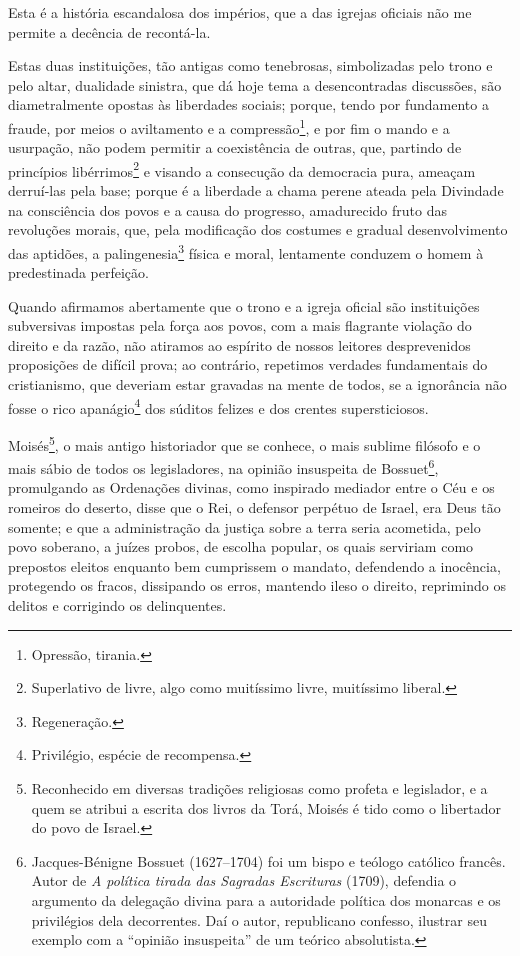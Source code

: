 Esta é a história escandalosa dos impérios, que a das igrejas oficiais
não me permite a decência de recontá-la.

Estas duas instituições, tão antigas como tenebrosas, simbolizadas pelo
trono e pelo altar, dualidade sinistra, que dá hoje tema a
desencontradas discussões, são diametralmente opostas às liberdades
sociais; porque, tendo por fundamento a fraude, por meios o aviltamento
e a compressão\footnote{Opressão, tirania.}, e por fim o mando e a
usurpação, não podem permitir a coexistência de outras, que, partindo de
princípios libérrimos\footnote{Superlativo de livre, algo como
  muitíssimo livre, muitíssimo liberal.} e visando a consecução da
democracia pura, ameaçam derruí-las pela base; porque é a liberdade a
chama perene ateada pela Divindade na consciência dos povos e a causa do
progresso, amadurecido fruto das revoluções morais, que, pela
modificação dos costumes e gradual desenvolvimento das aptidões, a
palingenesia\footnote{Regeneração.} física e moral, lentamente
conduzem o homem à predestinada perfeição.

Quando afirmamos abertamente que o trono e a igreja oficial são
instituições subversivas impostas pela força aos povos, com a mais
flagrante violação do direito e da razão, não atiramos ao espírito de
nossos leitores desprevenidos proposições de difícil prova; ao
contrário, repetimos verdades fundamentais do cristianismo, que deveriam
estar gravadas na mente de todos, se a ignorância não fosse o rico
apanágio\footnote{Privilégio, espécie de recompensa.} dos súditos
felizes e dos crentes supersticiosos.

Moisés\footnote{Reconhecido em diversas tradições religiosas como
  profeta e legislador, e a quem se atribui a escrita dos livros da
  Torá, Moisés é tido como o libertador do povo de Israel.}, o mais
antigo historiador que se conhece, o mais sublime filósofo e o mais
sábio de todos os legisladores, na opinião insuspeita de
Bossuet\footnote{Jacques-Bénigne Bossuet (1627--1704) foi um bispo e
  teólogo católico francês. Autor de \emph{A política tirada das
  Sagradas Escrituras} (1709), defendia o argumento da delegação divina
  para a autoridade política dos monarcas e os privilégios dela
  decorrentes. Daí o autor, republicano confesso, ilustrar seu exemplo
  com a ``opinião insuspeita'' de um teórico absolutista.}, promulgando as
Ordenações divinas, como inspirado mediador entre o Céu e os romeiros do
deserto, disse que o Rei, o defensor perpétuo de Israel, era Deus tão
somente; e que a administração da justiça sobre a terra seria acometida,
pelo povo soberano, a juízes probos, de escolha popular, os quais
serviriam como prepostos eleitos enquanto bem cumprissem o mandato,
defendendo a inocência, protegendo os fracos, dissipando os erros,
mantendo ileso o direito, reprimindo os delitos e corrigindo os
delinquentes.

